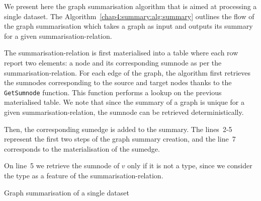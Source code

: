 We present here the graph summarisation algorithm that is aimed at processing a single dataset.
The Algorithm~\ref{chap4:summary:alg:summary} outlines the flow of the graph summarisation which takes a graph as input and outputs its summary for a given \gls{summarisation-relation}.

The \gls{summarisation-relation} is first materialised into a table where each row report two elements: a node and its corresponding sumnode as per the \gls{summarisation-relation}.
For each edge of the graph, the algorithm first retrieves the sumnodes corresponding to the source and target nodes thanks to the \texttt{GetSumnode} function. This function performs a lookup on the previous materialised table. We note that since the summary of a graph is unique for a given \gls{summarisation-relation}, the sumnode can be retrieved deterministically.

Then, the corresponding sumedge is added to the summary. The lines~2-5 represent the first two steps of the graph summary creation, and the line~7 corresponds to the materialisation of the sumedge.

\begin{remark}
On line~5 we retrieve the sumnode of $v$ only if it is not a type, since we consider the type as a feature of the \gls{summarisation-relation}.
\end{remark}

%	

\begin{algorithm}
	\DontPrintSemicolon
	\BlankLine
	\caption{Graph summarisation of a single dataset}
	\label{chap4:summary:alg:summary}
\end{algorithm}

